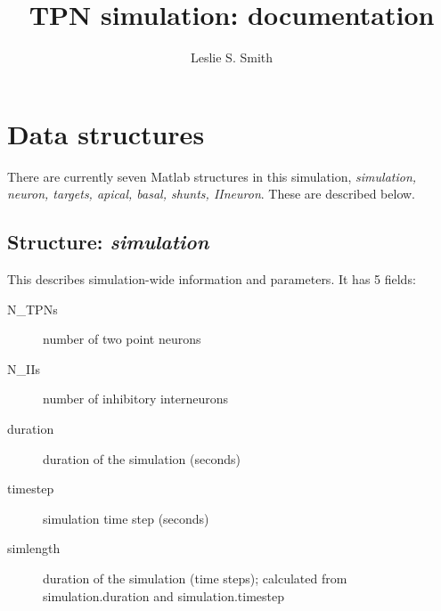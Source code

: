 \documentclass[11pt, oneside]{article}   	%
\title{TPN simulation: documentation}
\author{Leslie S. Smith}
\begin{document}
\maketitle
\section{Data structures}

There are currently seven Matlab structures in this simulation, {\it simulation, neuron, targets, apical, basal, shunts, IIneuron}. These are described below.

\subsection{Structure: {\it simulation}}
This describes simulation-wide information and parameters. It has 5 fields:
\begin{description}
\item[N\_TPNs ]  number of two point neurons
\item[N\_IIs] number of inhibitory interneurons
\item[duration] duration of the simulation (seconds)
\item[timestep] simulation time step (seconds)
\item[simlength] duration of the simulation (time steps); calculated from simulation.duration and  simulation.timestep
\end{description}
\end{document}
